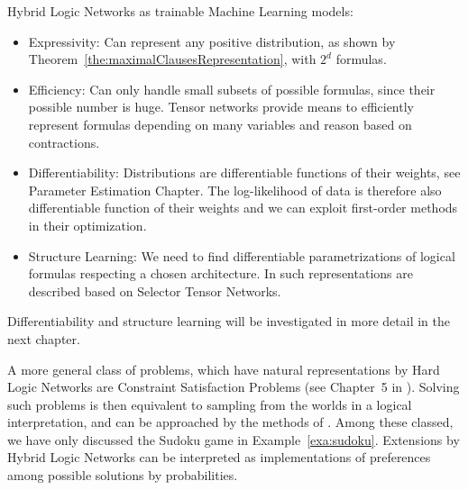 Hybrid Logic Networks as trainable Machine Learning models:
\begin{itemize}
	\item Expressivity: Can represent any positive distribution, as shown by Theorem~\ref{the:maximalClausesRepresentation}, with $2^d$ formulas.
	\item Efficiency: Can only handle small subsets of possible formulas, since their possible number is huge.
		Tensor networks provide means to efficiently represent formulas depending on many variables and reason based on contractions.
	\item Differentiability: Distributions are differentiable functions of their weights, see Parameter Estimation Chapter. 
		The log-likelihood of data is therefore also differentiable function of their weights and we can exploit first-order methods in their optimization.
	\item Structure Learning: We need to find differentiable parametrizations of logical formulas respecting a chosen architecture.
		In  such representations are described based on Selector Tensor Networks.
\end{itemize}
Differentiability and structure learning will be investigated in more detail in the next chapter.





A more general class of problems, which have natural representations by Hard Logic Networks are Constraint Satisfaction Problems (see Chapter~5 in \cite{russell_artificial_2021}).
Solving such problems is then equivalent to sampling from the worlds in a logical interpretation, and can be approached by the methods of .
Among these classed, we have only discussed the Sudoku game in Example~\ref{exa:sudoku}.
Extensions by Hybrid Logic Networks can be interpreted as implementations of preferences among possible solutions by probabilities.